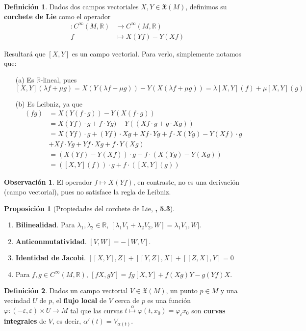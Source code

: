 \documentclass[spanish]{book}
\theoremstyle{definition}
\newtheorem*{defn}{Definición}
\newtheorem*{prop}{Proposición}
\newtheorem*{obs}{Observación}
\newcommand{\R}{\mathbb{R}}
\newcommand{\X}{\mathfrak{X}}
\newcommand{\Cinf}{C^\infty}
\begin{document}
	\begin{defn}
		Dados dos campos vectoriales $X,Y\in\X(M)$, definimos su \textbf{corchete de Lie} como el operador 
		\begin{align*}
			[X,Y]:\Cinf(M,\R)&\to\Cinf(M,\R)\\
			f&\mapsto X(Yf)-Y(Xf)
		\end{align*}
	\end{defn}
	Resultará que $[X,Y]$ es un campo vectorial. Para verlo, simplemente notamos que:
	\begin{enumerate}
		\item [(a)] Es $\R$-lineal, pues
		\[[X,Y](\lambda f+\mu g)=X(Y(\lambda f+\mu g))-Y(X(\lambda f+\mu g))=\lambda[X,Y](f)+\mu[X,Y](g)\]
		\item[(b)] Es Leibniz, ya que
		\begin{align*}
			[X,Y](fg)&=X(Y(f\cdot g))-Y(X(f\cdot g))\\
			&=X(Yf)\cdot g+f\cdot Yg)-Y((Xf\cdot g+g\cdot Xg))\\
			&=X(Yf)\cdot g+(Yf)\cdot Xg+Xf\cdot Yg+f\cdot X(Yg)-Y(Xf)\cdot g\\
			&+Xf\cdot Yg+Yf\cdot Xg+f\cdot Y(Xg)\\
			&=(X(Yf)-Y(Xf))\cdot g+f\cdot (X(Yg)-Y(Xg))\\
			&=([X,Y](f))\cdot g+f\cdot ([X,Y](g))
		\end{align*}
	\end{enumerate}
	\begin{obs}
		El operador $f\mapsto X(Yf)$, en contraste, no es una derivación (campo vectorial), pues no satisface la regla de Leibniz.
	\end{obs}
	\begin{prop}[Propiedades del corchete de Lie, \cite{DoCarmo}\textbf{, 5.3}]\leavevmode
		\begin{enumerate}
			\item \textbf{Bilinealidad}. Para $\lambda_1,\lambda_2\in\R$, $[\lambda_1V_1+\lambda_2V_2,W]=\lambda_1V_1,W]$.
			\item \textbf{Anticonmutatividad}. $[V,W]=-[W,V]$.
			\item \textbf{Identidad de Jacobi}. $[[X,Y],Z]+[[Y,Z],X]+[[Z,X],Y]=0$
			\item Para $f,g\in\Cinf(M,\R)$, $[fX,gY]=fg[X,Y]+f(Xg)Y-g(Yf)X$.
		\end{enumerate}
	\end{prop}
	\begin{defn}
		Dados un campo vectorial $V\in\X(M)$, un punto $p\in M$ y una vecindad $U$ de $p$, el \textbf{flujo local} de $V$ cerca de $p$ es una función $\varphi:(-\varepsilon,\varepsilon)\times U\to M$ tal que las curvas $t\overset{\alpha}{\mapsto}\varphi(t,x_0)=\varphi_tx_0$ son \textbf{curvas integrales} de $V$, es decir, $\alpha'(t)=V_{\alpha(t)}$.
	\end{defn}
\end{document}
